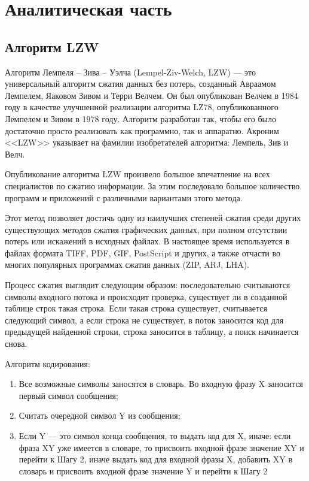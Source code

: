 \chapter{Аналитическая часть}

\section{Алгоритм LZW}

Алгоритм Лемпеля -- Зива -- Уэлча (Lempel-Ziv-Welch, LZW) --- это универсальный алгоритм сжатия данных без потерь, созданный Авраамом Лемпелем, Яаковом Зивом и Терри Велчем. Он был опубликован Велчем в 1984 году в качестве улучшенной реализации алгоритма LZ78, опубликованного Лемпелем и Зивом в 1978 году. Алгоритм разработан так, чтобы его было достаточно просто реализовать как программно, так и аппаратно. Акроним <<LZW>> указывает на фамилии изобретателей алгоритма: Лемпель, Зив и Велч.

Опубликование алгоритма LZW произвело большое впечатление на всех специалистов по сжатию информации. За этим последовало большое количество программ и приложений с различными вариантами этого метода.

Этот метод позволяет достичь одну из наилучших степеней сжатия среди других существующих методов сжатия графических данных, при полном отсутствии потерь или искажений в исходных файлах. В настоящее время используется в файлах формата TIFF, PDF, GIF, PostScript и других, а также отчасти во многих популярных программах сжатия данных (ZIP, ARJ, LHA).

Процесс сжатия выглядит следующим образом: последовательно считываются символы входного потока и происходит проверка, существует ли в созданной таблице строк такая строка. Если такая строка существует, считывается следующий символ, а если строка не существует, в поток заносится код для предыдущей найденной строки, строка заносится в таблицу, а поиск начинается снова.

Алгоритм кодирования:
\begin{enumerate}
	\item Все возможные символы заносятся в словарь. Во входную фразу X заносится первый символ сообщения;
	\item Считать очередной символ Y из сообщения;
	\item Если Y --- это символ конца сообщения, то выдать код для X, иначе: если фраза XY уже имеется в словаре, то присвоить входной фразе значение XY и перейти к Шагу 2, иначе выдать код для входной фразы X, добавить XY в словарь и присвоить входной фразе значение Y и перейти к Шагу 2
\end{enumerate}

